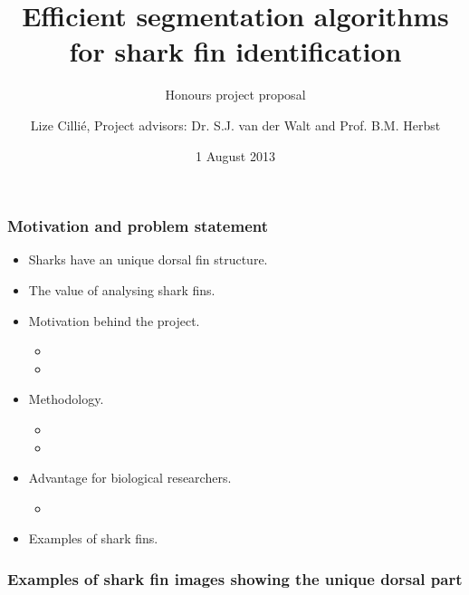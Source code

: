 \documentclass{beamer}
\title{Efficient segmentation algorithms for shark fin identification}
\subtitle{Honours project proposal}
\author{Lize Cilli\'{e}, Project advisors: Dr. S.J. van der Walt and Prof. B.M. Herbst}
\date{1 August 2013}
\institute{Department of Applied Mathematics, Stellenbosch University}
\begin{document}
\maketitle


\begin{frame}
\frametitle{Motivation and problem statement}
\begin{itemize}
\item Sharks have an unique dorsal fin structure.
\item The value of analysing shark fins.
\item Motivation behind the project.
\begin{itemize}
 \item 
 \item
\end{itemize}
\item Methodology.
\begin{itemize}
 \item 
 \item
\end{itemize}
\item Advantage for biological researchers.
\begin{itemize}
 \item
\end{itemize}
\item Examples of shark fins.
\end{itemize}
\end{frame}


\begin{frame}
\frametitle{Examples of shark fin images showing the unique dorsal part}
\begin{figure}
\centering
\mbox{ \quad
{}}
\end{figure}
\begin{figure}
\centering
\mbox{ \quad
{}}
\end{figure}
\end{frame}
\end{document}
